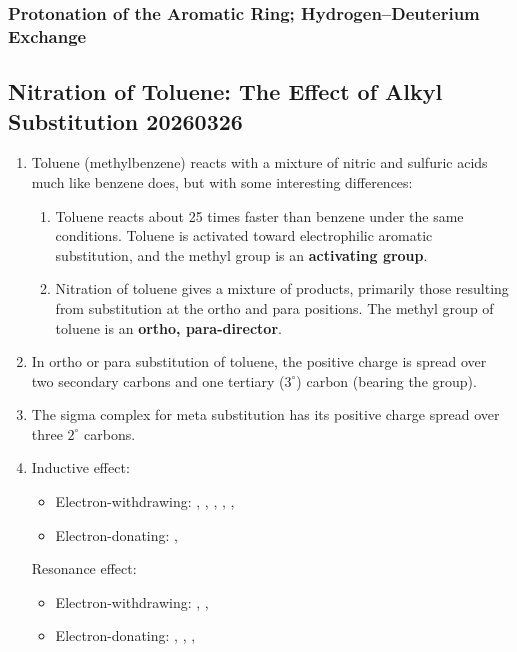 \subsubsection{Protonation of the Aromatic Ring; Hydrogen–Deuterium Exchange}

\subsection{Nitration of Toluene: The Effect of Alkyl Substitution 20260326}

\begin{enumerate}
    \item Toluene (methylbenzene) reacts with a mixture of nitric and sulfuric acids much like benzene does, but with some interesting differences:
    \begin{enumerate}
        \item Toluene reacts about 25 times faster than benzene under the same conditions. Toluene is activated toward electrophilic aromatic substitution, and the methyl group is an \textbf{activating group}.
        \item Nitration of toluene gives a mixture of products, primarily those resulting from substitution at the ortho and para positions. The methyl group of toluene is an \textbf{ortho, para-director}.
    \end{enumerate}
    \item In ortho or para substitution of toluene, the positive charge is spread over two secondary carbons and one tertiary ($ 3^{\circ} $) carbon (bearing the  group).
    \item The sigma complex for meta substitution has its positive charge spread over three $ 2^{\circ} $ carbons. 
    \item Inductive effect: %
    \begin{itemize}
        \item Electron-withdrawing: , , , , , 
        \item Electron-donating: , 
    \end{itemize}
    Resonance effect:
    \begin{itemize}
        \item Electron-withdrawing: , , 
        \item Electron-donating: , , , 
    \end{itemize}
    
\end{enumerate}

